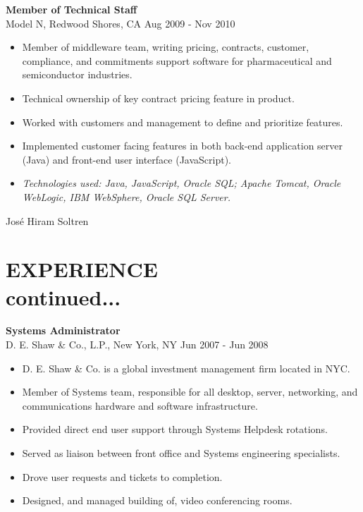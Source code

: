 \documentclass[line,margin]{res}
\begin{document}
\begin{resume}
\textbf{Member of Technical Staff} \\
Model N, Redwood Shores, CA \hfill Aug 2009 - Nov 2010
\begin{itemize}  \itemsep -2pt %
\item Member of middleware team, writing pricing, contracts, customer,
      compliance, and commitments support software for pharmaceutical and
      semiconductor industries.
\item Technical ownership of key contract pricing feature in product.
\item Worked with customers and management to define and prioritize features.
\item Implemented customer facing features in both back-end application server
      (Java) and front-end user interface (JavaScript).
\item \textit{Technologies used: Java, JavaScript, Oracle SQL; Apache Tomcat,
              Oracle\\\mbox{WebLogic}, IBM WebSphere, Oracle SQL Server.}
\end{itemize}

\newpage

{ \sffamily Jos\'e Hiram Soltren} \\ 

\section{EXPERIENCE\\continued...}

\textbf{Systems Administrator} \\
D. E. Shaw \& Co., L.P., New York, NY \hfill Jun 2007 - Jun 2008
\begin{itemize}  \itemsep -2pt %
\item D. E. Shaw \& Co. is a global investment management firm located in NYC.
\item Member of Systems team, responsible for all desktop, server, networking,
      and communications hardware and software infrastructure.
\item Provided direct end user support through Systems Helpdesk rotations.
\item Served as liaison between front office and Systems engineering
      specialists.
\item Drove user requests and tickets to completion.
\item Designed, and managed building of, video conferencing rooms.
\end{itemize}



\end{resume}
\end{document}
